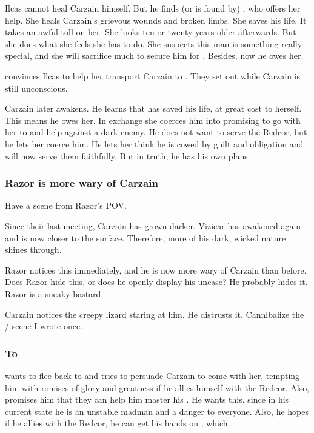 Ilcas cannot heal Carzain himself. 
But he finds (or is found by) \Esmerel, who offers her help.
She heals Carzain's grievous wounds and broken limbs. 
She saves his life. 
It takes an awful toll on her.
She looks ten or twenty years older afterwards. 
But she does what she feels she has to do.
She suspects this man is something really special, and she will sacrifice much to secure him for \ClanRedcor.
Besides, now he owes her. 

\Esmerel convinces Ilcas to help her transport Carzain to \Redce. 
They set out while Carzain is still unconscious. 

Carzain later awakens.
He learns that \Esmerel has saved his life, at great cost to herself. 
This means he owes her.
In exchange she coerces him into promising to go with her to \Redce and help \ClanRedcor against a dark enemy. 
He does not want to serve the Redcor, but he lets her coerce him.
He lets her think he is cowed by guilt and obligation and will now serve them faithfully. 
But in truth, he has his own plans. 





\subsubsection{Razor is more wary of Carzain}
Have a scene from Razor's POV. 

Since their last meeting, Carzain has grown darker. 
Vizicar has awakened again and is now closer to the surface. 
Therefore, more of his dark, wicked \sathariah{} nature shines through. 

Razor notices this immediately, and he is now more wary of Carzain than before. 
Does Razor hide this, or does he openly display his unease? 
He probably hides it. 
Razor is a sneaky bastard. 

Carzain notices the creepy lizard staring at him. 
He distrusts it. 
Cannibalize the / scene I wrote once. 





\subsubsection{To \Redce}
\Esmerel{} wants to flee back to \Redce{} and tries to persuade Carzain to come with her, tempting him with romises of glory and greatness if he allies himself with the Redcor. 
Also, \Esmerel{} promises him that they can help him master his . 
He wants this, since in his current state he is an unstable madman and a danger to everyone. 
Also, he hopes if he allies with the Redcor, he can get his hands on , which . 

